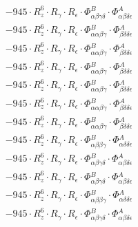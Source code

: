 \documentclass{article}
\begin{document}
\begin{subequations}
\begin{gather}
\begin{array}{c}
 \\[0.2em] 		 - 945 \cdot R_{z}^{6} \cdot R_{\gamma{}} \cdot R_{\epsilon{}} \cdot \Phi{}^{B}_{\alpha{}\beta{}\gamma{}\delta{}} \cdot \Phi{}^{A}_{\alpha{}\beta{}\delta{}\epsilon{}} 
 \\[0.2em] 		 - 945 \cdot R_{z}^{6} \cdot R_{\gamma{}} \cdot R_{\epsilon{}} \cdot \Phi{}^{B}_{\alpha{}\alpha{}\beta{}\gamma{}} \cdot \Phi{}^{A}_{\beta{}\delta{}\delta{}\epsilon{}} 
 \\[0.2em] 		 - 945 \cdot R_{z}^{6} \cdot R_{\gamma{}} \cdot R_{\epsilon{}} \cdot \Phi{}^{B}_{\alpha{}\alpha{}\beta{}\gamma{}} \cdot \Phi{}^{A}_{\beta{}\delta{}\delta{}\epsilon{}} 
 \\[0.2em] 		 - 945 \cdot R_{z}^{6} \cdot R_{\gamma{}} \cdot R_{\epsilon{}} \cdot \Phi{}^{B}_{\alpha{}\alpha{}\beta{}\gamma{}} \cdot \Phi{}^{A}_{\beta{}\delta{}\delta{}\epsilon{}} 
 \\[0.2em] 		 - 945 \cdot R_{z}^{6} \cdot R_{\gamma{}} \cdot R_{\epsilon{}} \cdot \Phi{}^{B}_{\alpha{}\alpha{}\beta{}\gamma{}} \cdot \Phi{}^{A}_{\beta{}\delta{}\delta{}\epsilon{}} 
 \\[0.2em] 		 - 945 \cdot R_{z}^{6} \cdot R_{\gamma{}} \cdot R_{\epsilon{}} \cdot \Phi{}^{B}_{\alpha{}\alpha{}\beta{}\gamma{}} \cdot \Phi{}^{A}_{\beta{}\delta{}\delta{}\epsilon{}} 
 \\[0.2em] 		 - 945 \cdot R_{z}^{6} \cdot R_{\gamma{}} \cdot R_{\epsilon{}} \cdot \Phi{}^{B}_{\alpha{}\alpha{}\beta{}\gamma{}} \cdot \Phi{}^{A}_{\beta{}\delta{}\delta{}\epsilon{}} 
 \\[0.2em] 		 - 945 \cdot R_{z}^{6} \cdot R_{\gamma{}} \cdot R_{\epsilon{}} \cdot \Phi{}^{B}_{\alpha{}\beta{}\beta{}\gamma{}} \cdot \Phi{}^{A}_{\alpha{}\delta{}\delta{}\epsilon{}} 
 \\[0.2em] 		 - 945 \cdot R_{z}^{6} \cdot R_{\gamma{}} \cdot R_{\epsilon{}} \cdot \Phi{}^{B}_{\alpha{}\beta{}\gamma{}\delta{}} \cdot \Phi{}^{A}_{\alpha{}\beta{}\delta{}\epsilon{}} 
 \\[0.2em] 		 - 945 \cdot R_{z}^{6} \cdot R_{\gamma{}} \cdot R_{\epsilon{}} \cdot \Phi{}^{B}_{\alpha{}\beta{}\gamma{}\delta{}} \cdot \Phi{}^{A}_{\alpha{}\beta{}\delta{}\epsilon{}} 
 \\[0.2em] 		 - 945 \cdot R_{z}^{6} \cdot R_{\gamma{}} \cdot R_{\epsilon{}} \cdot \Phi{}^{B}_{\alpha{}\beta{}\beta{}\gamma{}} \cdot \Phi{}^{A}_{\alpha{}\delta{}\delta{}\epsilon{}} 
 \\[0.2em] 		 - 945 \cdot R_{z}^{6} \cdot R_{\gamma{}} \cdot R_{\epsilon{}} \cdot \Phi{}^{B}_{\alpha{}\beta{}\gamma{}\delta{}} \cdot \Phi{}^{A}_{\alpha{}\beta{}\delta{}\epsilon{}} 

\end{array}
\end{gather}
\end{subequations}
\end{document}
